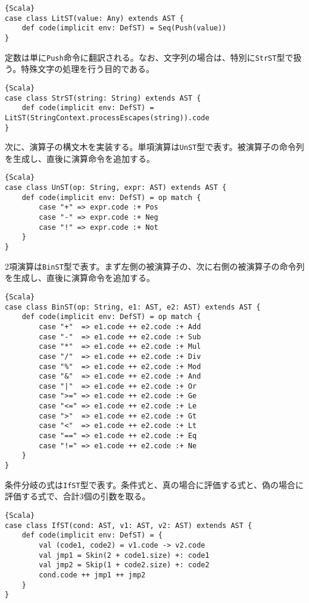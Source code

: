 \documentclass[10pt,a4paper]{book}
\begin{document}
\begin{Verbatim}{Scala}
case class LitST(value: Any) extends AST {
	def code(implicit env: DefST) = Seq(Push(value))
}
\end{Verbatim}

定数は単に\texttt{Push}命令に翻訳される。なお、文字列の場合は、特別に\texttt{StrST}型で扱う。特殊文字の処理を行う目的である。

\begin{Verbatim}{Scala}
case class StrST(string: String) extends AST {
	def code(implicit env: DefST) = LitST(StringContext.processEscapes(string)).code
}
\end{Verbatim}

次に、演算子の構文木を実装する。単項演算は\texttt{UnST}型で表す。被演算子の命令列を生成し、直後に演算命令を追加する。

\begin{Verbatim}{Scala}
case class UnST(op: String, expr: AST) extends AST {
	def code(implicit env: DefST) = op match {
		case "+" => expr.code :+ Pos
		case "-" => expr.code :+ Neg
		case "!" => expr.code :+ Not
	}
}
\end{Verbatim}

2項演算は\texttt{BinST}型で表す。まず左側の被演算子の、次に右側の被演算子の命令列を生成し、直後に演算命令を追加する。

\begin{Verbatim}{Scala}
case class BinST(op: String, e1: AST, e2: AST) extends AST {
	def code(implicit env: DefST) = op match {
		case "+"  => e1.code ++ e2.code :+ Add
		case "-"  => e1.code ++ e2.code :+ Sub
		case "*"  => e1.code ++ e2.code :+ Mul
		case "/"  => e1.code ++ e2.code :+ Div
		case "%"  => e1.code ++ e2.code :+ Mod
		case "&"  => e1.code ++ e2.code :+ And
		case "|"  => e1.code ++ e2.code :+ Or
		case ">=" => e1.code ++ e2.code :+ Ge
		case "<=" => e1.code ++ e2.code :+ Le
		case ">"  => e1.code ++ e2.code :+ Gt
		case "<"  => e1.code ++ e2.code :+ Lt
		case "==" => e1.code ++ e2.code :+ Eq
		case "!=" => e1.code ++ e2.code :+ Ne
	}
}
\end{Verbatim}

条件分岐の式は\texttt{IfST}型で表す。条件式と、真の場合に評価する式と、偽の場合に評価する式で、合計3個の引数を取る。

\begin{Verbatim}{Scala}
case class IfST(cond: AST, v1: AST, v2: AST) extends AST {
	def code(implicit env: DefST) = {
		val (code1, code2) = v1.code -> v2.code
		val jmp1 = Skin(2 + code1.size) +: code1
		val jmp2 = Skip(1 + code2.size) +: code2
		cond.code ++ jmp1 ++ jmp2
	}
}
\end{Verbatim}
\end{document}
